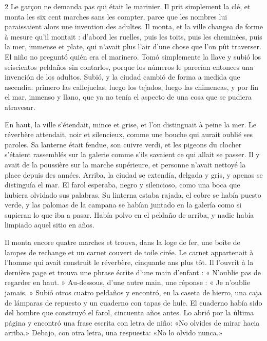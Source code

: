 \begin{paracol}{2}
\pair
  {Le garçon ne demanda pas qui était le marinier. Il prit simplement la
   clé, et monta les six cent marches sans les compter, parce que les nombres
   lui paraissaient alors une invention des adultes. Il monta, et la ville
   changea de forme à mesure qu'il montait : d'abord les ruelles, puis les
   toits, puis les cheminées, puis la mer, immense et plate, qui n'avait plus
   l'air d'une chose que l'on pût traverser.}
  {El niño no preguntó quién era el marinero. Tomó simplemente la llave y
   subió los seiscientos peldaños sin contarlos, porque los números le
   parecían entonces una invención de los adultos. Subió, y la ciudad cambió
   de forma a medida que ascendía: primero las callejuelas, luego los tejados,
   luego las chimeneas, y por fin el mar, inmenso y llano, que ya no tenía el
   aspecto de una cosa que se pudiera atravesar.}

\pair
  {En haut, la ville s'étendait, mince et grise, et l'on distinguait à peine
   la mer. Le réverbère attendait, noir et silencieux, comme une bouche qui
   aurait oublié ses paroles. Sa lanterne était fendue, son cuivre verdi, et
   les pigeons du clocher s'étaient rassemblés sur la galerie comme s'ils
   savaient ce qui allait se passer. Il y avait de la poussière sur la marche
   supérieure, et personne n'avait nettoyé la place depuis des années.}
  {Arriba, la ciudad se extendía, delgada y gris, y apenas se distinguía el
   mar. El farol esperaba, negro y silencioso, como una boca que hubiera
   olvidado sus palabras. Su linterna estaba rajada, el cobre se había puesto
   verde, y las palomas de la campana se habían juntado en la galería como si
   supieran lo que iba a pasar. Había polvo en el peldaño de arriba, y nadie
   había limpiado aquel sitio en años.}

\pair
  {Il monta encore quatre marches et trouva, dans la loge de fer, une boîte de
   lampes de rechange et un carnet couvert de toile cirée. Le carnet
   appartenait à l'homme qui avait construit le réverbère, cinquante ans plus
   tôt. Il l'ouvrit à la dernière page et trouva une phrase écrite d'une main
   d'enfant : « N'oublie pas de regarder en haut. » Au-dessous, d'une autre
   main, une réponse : « Je n'oublie jamais. »}
  {Subió otros cuatro peldaños y encontró, en la caseta de hierro, una caja de
   lámparas de repuesto y un cuaderno con tapas de hule. El cuaderno había
   sido del hombre que construyó el farol, cincuenta años antes. Lo abrió por
   la última página y encontró una frase escrita con letra de niño: «No
   olvides de mirar hacia arriba.» Debajo, con otra letra, una respuesta:
   «No lo olvido nunca.»}


\end{paracol}
